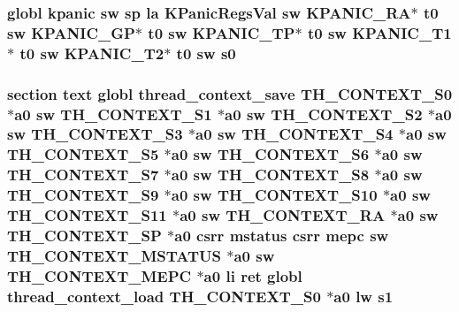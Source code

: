 \hypertarget{riscv_2kpanica_8S_a4b361c0a12319701bbf09dc2a192b0e0}{
\subsubsection[{s0}]{\setlength{\rightskip}{0pt plus 5cm}globl {\bf kpanic} {\bf sw} {\bf sp} {\bf la} {\bf K\-Panic\-Regs\-Val} {\bf sw} {\bf K\-P\-A\-N\-I\-C\-\_\-\-R\-A}$\ast$ {\bf t0} {\bf sw} {\bf K\-P\-A\-N\-I\-C\-\_\-\-G\-P}$\ast$ {\bf t0} {\bf sw} {\bf K\-P\-A\-N\-I\-C\-\_\-\-T\-P}$\ast$ {\bf t0} {\bf sw} {\bf K\-P\-A\-N\-I\-C\-\_\-\-T1}$\ast$ {\bf t0} {\bf sw} {\bf K\-P\-A\-N\-I\-C\-\_\-\-T2}$\ast$ {\bf t0} {\bf sw} s0}}\label{riscv_2kpanica_8S_a4b361c0a12319701bbf09dc2a192b0e0}
\hypertarget{riscv_2kpanica_8S_ab075f86d8c4bc4706ade8f8b5af13288}{
\subsubsection[{s1}]{\setlength{\rightskip}{0pt plus 5cm}section text globl {\bf thread\-\_\-context\-\_\-save} {\bf T\-H\-\_\-\-C\-O\-N\-T\-E\-X\-T\-\_\-\-S0} $\ast${\bf a0} {\bf sw} {\bf T\-H\-\_\-\-C\-O\-N\-T\-E\-X\-T\-\_\-\-S1} $\ast${\bf a0} {\bf sw} {\bf T\-H\-\_\-\-C\-O\-N\-T\-E\-X\-T\-\_\-\-S2} $\ast${\bf a0} {\bf sw} {\bf T\-H\-\_\-\-C\-O\-N\-T\-E\-X\-T\-\_\-\-S3} $\ast${\bf a0} {\bf sw} {\bf T\-H\-\_\-\-C\-O\-N\-T\-E\-X\-T\-\_\-\-S4} $\ast${\bf a0} {\bf sw} {\bf T\-H\-\_\-\-C\-O\-N\-T\-E\-X\-T\-\_\-\-S5} $\ast${\bf a0} {\bf sw} {\bf T\-H\-\_\-\-C\-O\-N\-T\-E\-X\-T\-\_\-\-S6} $\ast${\bf a0} {\bf sw} {\bf T\-H\-\_\-\-C\-O\-N\-T\-E\-X\-T\-\_\-\-S7} $\ast${\bf a0} {\bf sw} {\bf T\-H\-\_\-\-C\-O\-N\-T\-E\-X\-T\-\_\-\-S8} $\ast${\bf a0} {\bf sw} {\bf T\-H\-\_\-\-C\-O\-N\-T\-E\-X\-T\-\_\-\-S9} $\ast${\bf a0} {\bf sw} {\bf T\-H\-\_\-\-C\-O\-N\-T\-E\-X\-T\-\_\-\-S10} $\ast${\bf a0} {\bf sw} {\bf T\-H\-\_\-\-C\-O\-N\-T\-E\-X\-T\-\_\-\-S11} $\ast${\bf a0} {\bf sw} {\bf T\-H\-\_\-\-C\-O\-N\-T\-E\-X\-T\-\_\-\-R\-A} $\ast${\bf a0} {\bf sw} {\bf T\-H\-\_\-\-C\-O\-N\-T\-E\-X\-T\-\_\-\-S\-P} $\ast${\bf a0} csrr {\bf mstatus} csrr {\bf mepc} {\bf sw} {\bf T\-H\-\_\-\-C\-O\-N\-T\-E\-X\-T\-\_\-\-M\-S\-T\-A\-T\-U\-S} $\ast${\bf a0} {\bf sw} {\bf T\-H\-\_\-\-C\-O\-N\-T\-E\-X\-T\-\_\-\-M\-E\-P\-C} $\ast${\bf a0} {\bf li} ret globl {\bf thread\-\_\-context\-\_\-load} {\bf T\-H\-\_\-\-C\-O\-N\-T\-E\-X\-T\-\_\-\-S0} $\ast${\bf a0} {\bf lw} s1}}\label{riscv_2kpanica_8S_ab075f86d8c4bc4706ade8f8b5af13288}


